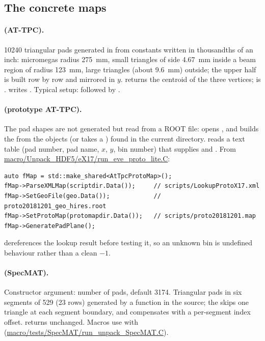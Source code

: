 \subsection{The concrete maps}

\paragraph{ (AT-TPC).} 10240 triangular pads generated in 
from constants written in thousandths of an inch: micromegas radius 275~mm, small triangles of side
4.67~mm inside a beam region of radius 123~mm, large triangles (about 9.6~mm) outside; the upper half
is built row by row and mirrored in $y$.  returns the centroid of the three
vertices;  is .  writes . Typical setup:
 followed by .

\paragraph{ (prototype AT-TPC).} The pad shapes are not generated but read from a
ROOT file:  opens , and
 builds the  from the  objects (or takes a
) found in the current directory.  reads a text table
(pad number, pad name, $x$, $y$, bin number) that supplies  and .
From \url{macro/Unpack_HDF5/eX17/run_eve_proto_lite.C}:
\begin{verbatim}
auto fMap = std::make_shared<AtTpcProtoMap>();
fMap->ParseXMLMap(scriptdir.Data());     // scripts/LookupProtoX17.xml
fMap->SetGeoFile(geo.Data());            // proto20181201_geo_hires.root
fMap->SetProtoMap(protomapdir.Data());   // scripts/proto20181201.map
fMap->GeneratePadPlane();
\end{verbatim}
 dereferences the lookup result before testing it, so an unknown bin is undefined
behaviour rather than a clean $-1$.

\paragraph{ (SpecMAT).} Constructor argument: number of pads, default 3174.
Triangular pads in six segments of 529 (23 rows) generated by a function in the source; the
 skips one triangle at each segment boundary, and  compensates with a
per-segment index offset.  returns  unchanged. Macros use
 with 
(\url{macro/tests/SpecMAT/run_unpack_SpecMAT.C}).

